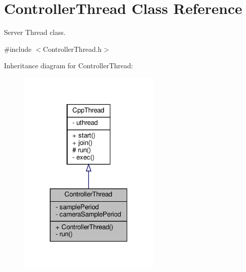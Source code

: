 \hypertarget{classControllerThread}{}\section{Controller\+Thread Class Reference}
\label{classControllerThread}


Server Thread class.  




{\ttfamily \#include $<$Controller\+Thread.\+h$>$}



Inheritance diagram for Controller\+Thread\+:\nopagebreak
\begin{figure}[H]
\begin{center}
\leavevmode
\includegraphics[width=196pt]{classControllerThread__inherit__graph}
\end{center}
\end{figure}


